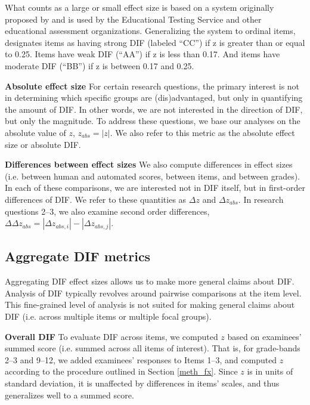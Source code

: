 \documentclass [PhD] {uclathes}
\begin{document}
What counts as a large or small effect size is based on a system originally proposed by \citet{zwick1993assessment} and is used by the Educational Testing Service and other educational assessment organizations. Generalizing the system to ordinal items, \citet[][p. 150]{naep2001} designates items as having strong DIF (labeled “CC”) if z is greater than or equal to 0.25. Items have weak DIF (“AA”) if z is less than 0.17. And items have moderate DIF (“BB”) if z is between 0.17 and 0.25. 

\noindent \textbf{Absolute effect size} \;
For certain research questions, the primary interest is not in determining which specific groups are (dis)advantaged, but only in quantifying the amount of DIF. In other words, we are not interested in the direction of DIF, but only the magnitude. To address these questions, we base our analyses on the absolute value of $z$, $z_{abs} = |z|$. We also refer to this metric as the absolute effect size or absolute DIF. 

\noindent \textbf{Differences between effect sizes} \;
We also compute differences in effect sizes (i.e. between human and automated scores, between items, and between grades). In each of these comparisons, we are interested not in DIF itself, but in first-order differences of DIF. We refer to these quantities as $\Delta z$ and $\Delta z_{abs}$. In research questions 2–3, we also examine second order differences, $\Delta \Delta z_{abs} = |\Delta z_{abs,i}| - |\Delta z_{abs,j}|$.

\subsection{Aggregate DIF metrics}

Aggregating DIF effect sizes allows us to make more general claims about DIF. Analysis of DIF typically revolves around pairwise comparisons at the item level. This fine-grained level of analysis is not suited for making general claims about DIF (i.e. across multiple items or multiple focal groups). 

\noindent \textbf{Overall DIF} \;
To evaluate DIF across items, we computed $z$ based on examinees’ summed score (i.e. summed across all items of interest). That is, for grade-bands 2–3 and 9–12, we added examinees’ responses to Items 1–3, and computed $z$ according to the procedure outlined in Section \ref{meth_fx}. Since $z$ is in units of standard deviation, it is unaffected by differences in items’ scales, and thus generalizes well to a summed score. 
\end{document}
